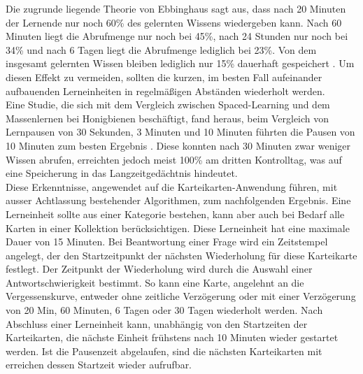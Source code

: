 \noindent Die zugrunde liegende Theorie von Ebbinghaus sagt aus, dass nach 20 Minuten der Lernende nur noch 60{\%} des gelernten Wissens wiedergeben kann. Nach 60 Minuten liegt die Abrufmenge nur noch bei 45{\%}, nach 24 Stunden nur noch bei 34{\%} und nach 6 Tagen liegt die Abrufmenge lediglich bei 23{\%}. Von dem insgesamt gelernten Wissen bleiben lediglich nur 15{\%} dauerhaft gespeichert \cite{Liss.2020}. Um diesen Effekt zu vermeiden, sollten die kurzen, im besten Fall aufeinander aufbauenden Lerneinheiten in regelmäßigen Abständen wiederholt werden. \\

\noindent Eine Studie, die sich mit dem Vergleich zwischen Spaced-Learning und dem Massenlernen bei Honigbienen beschäftigt, fand heraus, beim Vergleich von Lernpausen von 30 Sekunden, 3 Minuten und 10 Minuten führten die Pausen von 10 Minuten zum besten Ergebnis \cite{Menzel.2001}. Diese konnten nach 30 Minuten zwar weniger Wissen abrufen, erreichten jedoch meist 100{\%} am dritten Kontrolltag, was auf eine Speicherung in das Langzeitgedächtnis hindeutet. \\

\noindent Diese Erkenntnisse, angewendet auf die Karteikarten-Anwendung führen, mit ausser Achtlassung bestehender Algorithmen, zum nachfolgenden Ergebnis. Eine Lerneinheit sollte aus einer Kategorie bestehen, kann aber auch bei Bedarf alle Karten in einer Kollektion berücksichtigen. Diese Lerneinheit hat eine maximale Dauer von 15 Minuten. 
Bei Beantwortung einer Frage wird ein Zeitstempel angelegt, der den Startzeitpunkt der nächsten Wiederholung für diese Karteikarte festlegt. Der Zeitpunkt der Wiederholung wird durch die Auswahl einer Antwortschwierigkeit bestimmt. So kann eine Karte, angelehnt an die Vergessenskurve, entweder ohne zeitliche Verzögerung oder mit einer Verzögerung von 20 Min, 60 Minuten, 6 Tagen oder 30 Tagen wiederholt werden. 
Nach Abschluss einer Lerneinheit kann, unabhängig von den Startzeiten der Karteikarten, die nächste Einheit frühstens nach 10 Minuten wieder gestartet werden. Ist die Pausenzeit abgelaufen, sind die nächsten Karteikarten mit erreichen dessen Startzeit wieder aufrufbar.



